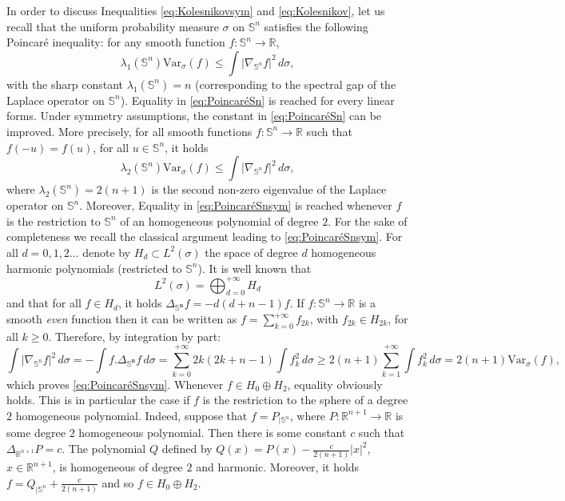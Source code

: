 \documentclass[10pt]{amsart}
\theoremstyle{definition}
\theoremstyle{remark}
\newcommand{\R}{\mathbb{R}}
\newcommand{\Sd}{\mathbb{S}}
\begin{document}
In order to discuss Inequalities  \eqref{eq:Kolesnikovsym} and \eqref{eq:Kolesnikov}, let us recall that the uniform probability measure $\sigma$ on $\Sd^n$ satisfies the following Poincaré inequality: for any smooth function $f:\Sd^n \to \R$, 
\begin{equation}\label{eq:PoincaréSn}
\lambda_1(\Sd^n) \mathrm{Var}_\sigma(f) \leq \int |\nabla_{\Sd^n} f|^2\,d\sigma,
\end{equation}
with the sharp constant $\lambda_1(\Sd^n)=n$ (corresponding to the spectral gap of the Laplace operator on $\Sd^n$). Equality in \eqref{eq:PoincaréSn} is reached for every linear forms. Under symmetry assumptions, the constant in \eqref{eq:PoincaréSn} can be improved. More precisely, for all smooth functions $f:\Sd^n \to \R$ such that $f(-u)=f(u)$, for all $u\in \Sd^n$, it holds 
\begin{equation}\label{eq:PoincaréSnsym}
\lambda_2(\Sd^n) \mathrm{Var}_\sigma(f) \leq \int |\nabla_{\Sd^n} f|^2\,d\sigma,
\end{equation}
where $\lambda_2(\Sd^n) = 2(n+1)$ is the second non-zero eigenvalue of the Laplace operator on $\Sd^n$. Moreover, Equality in \eqref{eq:PoincaréSnsym} is reached whenever $f$ is the restriction to $\Sd^n$ of an homogeneous polynomial of degree $2$.
For the sake of completeness we recall the classical argument leading to \eqref{eq:PoincaréSnsym}.
For all $d=0,1,2\ldots$ denote by $H_d \subset L^2(\sigma)$ the space of degree $d$ homogeneous harmonic polynomials (restricted to $\Sd^n$). It is well known that 
\[
L^2(\sigma) =  \bigoplus_{d=0}^{+\infty} H_d
\]
and that for all $f \in H_d$, it holds $\Delta_{\mathbf{\Sd^n}} f = - d(d+n-1) f$.
If $f:\Sd^n \to \R$ is a smooth \emph{even} function then it can be written as $f=\sum_{k=0}^{+\infty} f_{2k}$, with $f_{2k} \in H_{2k}$, for all $k\geq0.$ Therefore, by integration by part:
\[
\int |\nabla_{\Sd^n} f|^2\,d\sigma = - \int f.\Delta_{\mathbf{\Sd^n}} f\,d\sigma =  \sum_{k=0}^{+\infty} 2k(2k+n-1) \int f_k^2\,d\sigma \geq 2(n+1) \sum_{k=1}^{+\infty}\int f_k^2\,d\sigma =2(n+1) \mathrm{Var}_\sigma(f),
\]
which proves \eqref{eq:PoincaréSnsym}. Whenever $f \in H_0\oplus H_2$, equality obviously holds. This is in particular the case if $f$ is the restriction to the sphere of a degree $2$ homogeneous polynomial. Indeed, suppose that $f = P_{| \Sd^n}$, where $P:\R^{n+1} \to \R$ is some degree $2$ homogeneous polynomial. Then there is some constant $c$ such that $\Delta_{\R^{n+1}} P = c$. The polynomial $Q$ defined by $Q(x) = P(x) - \frac{c}{2(n+1)} |x|^2$, $x \in \R^{n+1}$, is homogeneous of degree $2$ and harmonic. Moreover, it holds $f=Q_{| \Sd^n} + \frac{c}{2(n+1)}$ and so $f \in H_0\oplus H_2$.
\endproof
\end{document}
